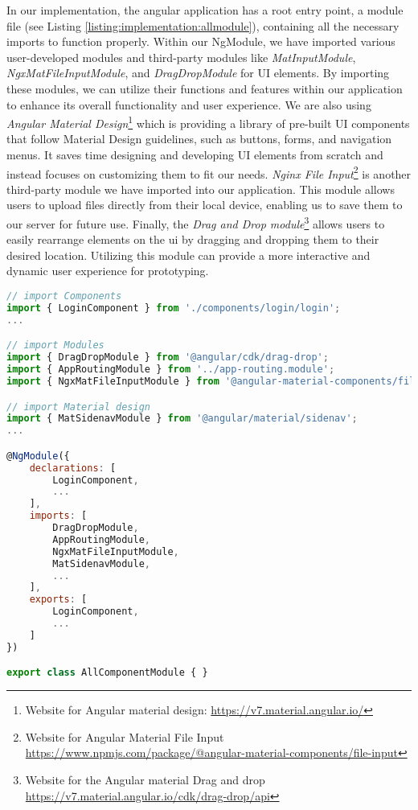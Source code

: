 In our implementation, the angular application has a root entry point, a module file (see Listing \ref{listing:implementation:allmodule}), containing all the necessary imports to function properly. 
Within our NgModule, we have imported various user-developed modules and third-party modules like \textit{MatInputModule}, \textit{NgxMatFileInputModule}, and \textit{DragDropModule} for UI elements. 
By importing these modules, we can utilize their functions and features within our application to enhance its overall functionality and user experience.
We are also using \textit{Angular Material Design}\footnote{Website for Angular material design: \url{https://v7.material.angular.io/}} which is providing a library of pre-built UI components that follow Material Design guidelines, such as buttons, forms, and navigation menus. 
It saves time designing and developing UI elements from scratch and instead focuses on customizing them to fit our needs.
\textit{Nginx File Input}\footnote{Website for Angular Material File Input \url{https://www.npmjs.com/package/@angular-material-components/file-input}} is another third-party module we have imported into our application. 
This module allows users to upload files directly from their local device, enabling us to save them to our server for future use.
Finally, the \textit{Drag and Drop module}\footnote{Website for the Angular material Drag and drop \url{https://v7.material.angular.io/cdk/drag-drop/api}} allows users to easily rearrange elements on the \ac{ui} by dragging and dropping them to their desired location. 
Utilizing this module can provide a more interactive and dynamic user experience for prototyping.

\begin{lstlisting}[language=JavaScript, caption=all-component.module.ts, label=listing:implementation:allmodule]
// import Components
import { LoginComponent } from './components/login/login';
...

// import Modules
import { DragDropModule } from '@angular/cdk/drag-drop';
import { AppRoutingModule } from '../app-routing.module';
import { NgxMatFileInputModule } from '@angular-material-components/file-input';

// import Material design
import { MatSidenavModule } from '@angular/material/sidenav';
...

@NgModule({
    declarations: [
        LoginComponent,
        ...
    ],
    imports: [
        DragDropModule,
        AppRoutingModule,
        NgxMatFileInputModule,
        MatSidenavModule,
        ...
    ],
    exports: [
        LoginComponent, 
        ...
    ]
})

export class AllComponentModule { }
\end{lstlisting}


